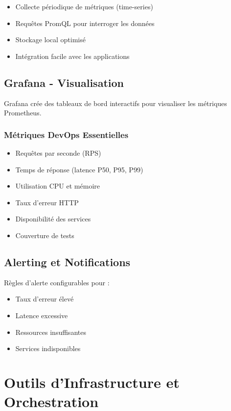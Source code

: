\documentclass[12pt,a4paper]{report}
\begin{document}
\begin{itemize}
    \item Collecte périodique de métriques (time-series)
    \item Requêtes PromQL pour interroger les données
    \item Stockage local optimisé
    \item Intégration facile avec les applications
\end{itemize}

\subsection{Grafana - Visualisation}

Grafana crée des tableaux de bord interactifs pour visualiser les métriques Prometheus.

\subsubsection{Métriques DevOps Essentielles}

\begin{itemize}
    \item Requêtes par seconde (RPS)
    \item Temps de réponse (latence P50, P95, P99)
    \item Utilisation CPU et mémoire
    \item Taux d'erreur HTTP
    \item Disponibilité des services
    \item Couverture de tests
\end{itemize}

\subsection{Alerting et Notifications}

Règles d'alerte configurables pour :

\begin{itemize}
    \item Taux d'erreur élevé
    \item Latence excessive
    \item Ressources insuffisantes
    \item Services indisponibles
\end{itemize}

\section{Outils d'Infrastructure et Orchestration}
\end{document}
